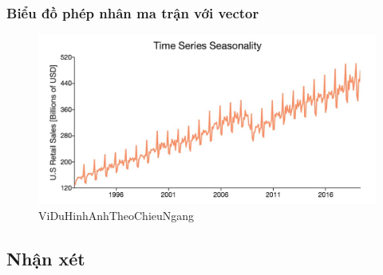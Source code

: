 
 
\begin{landscape} 
\subsubsection{Biểu đồ phép nhân ma trận với vector}


\begin{figure}[h] %
    \centering
    \includegraphics[width=1\textwidth]{pictures/ts-pp-seasonality.jpg} %
    \caption{ViDuHinhAnhTheoChieuNgang} %
    \label{pictures:nghia12} %
\end{figure}

\end{landscape}

\subsection{Nhận xét}
\lipsum[1]


